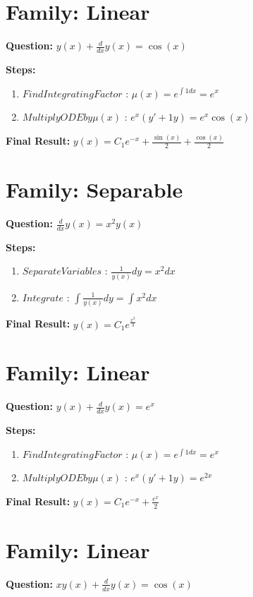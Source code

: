 \documentclass{article}
\begin{document}
\section*{Family: Linear}
\textbf{Question:} $y{\left(x \right)} + \frac{d}{d x} y{\left(x \right)} = \cos{\left(x \right)}$

\textbf{Steps:}
\begin{enumerate}
\item $Find Integrating Factor$ :  $\mu(x) = e^{\int 1 dx} = e^{x}$
\item $Multiply ODE by \mu(x)$ :  $e^{x}(y' + 1y) = e^{x} \cos{\left(x \right)}$
\end{enumerate}
\textbf{Final Result:} $y{\left(x \right)} = C_{1} e^{- x} + \frac{\sin{\left(x \right)}}{2} + \frac{\cos{\left(x \right)}}{2}$

\section*{Family: Separable}
\textbf{Question:} $\frac{d}{d x} y{\left(x \right)} = x^{2} y{\left(x \right)}$

\textbf{Steps:}
\begin{enumerate}
\item $Separate Variables$ :  $\frac{1}{y{\left(x \right)}} dy = x^{2} dx$
\item $Integrate$ :  $\int \frac{1}{y{\left(x \right)}} dy = \int x^{2} dx$
\end{enumerate}
\textbf{Final Result:} $y{\left(x \right)} = C_{1} e^{\frac{x^{3}}{3}}$

\section*{Family: Linear}
\textbf{Question:} $y{\left(x \right)} + \frac{d}{d x} y{\left(x \right)} = e^{x}$

\textbf{Steps:}
\begin{enumerate}
\item $Find Integrating Factor$ :  $\mu(x) = e^{\int 1 dx} = e^{x}$
\item $Multiply ODE by \mu(x)$ :  $e^{x}(y' + 1y) = e^{2 x}$
\end{enumerate}
\textbf{Final Result:} $y{\left(x \right)} = C_{1} e^{- x} + \frac{e^{x}}{2}$

\section*{Family: Linear}
\textbf{Question:} $x y{\left(x \right)} + \frac{d}{d x} y{\left(x \right)} = \cos{\left(x \right)}$
\end{document}
